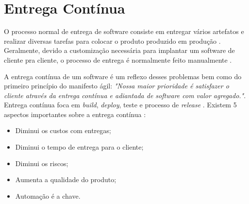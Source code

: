 \section{Entrega Contínua}

O processo normal de entrega de software consiste em entregar vários artefatos e realizar diversas tarefas para colocar o produto produzido em produção \cite{deploy1}. Geralmente, devido a customização necessária para implantar um software de cliente pra cliente, o processo de entrega é normalmente feito manualmente \cite{livro-deploy-continuo}.

A entrega contínua de um software é um reflexo desses problemas bem como do primeiro princípio do manifesto ágil: \textit{"Nossa maior prioridade é satisfazer o cliente através da entrega contínua e adiantada de software com valor agregado."}\cite{manifesto}. Entrega contínua foca em \textit{build}, \textit{deploy}, teste e processo de \textit{release} \cite{livro-deploy-continuo}.
Existem 5 aspectos importantes sobre a entrega contínua \cite{network-world}:
\begin{itemize}
    \item Diminui os custos com entregas;
    \item Diminui o tempo de entrega para o cliente;
    \item Diminui os riscos;
    \item Aumenta a qualidade do produto;
    \item Automação é a chave.
\end{itemize}
